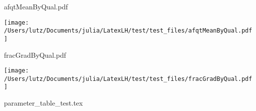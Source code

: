 \documentclass[english]{beamer}
\begin{document}
\begin{frame}{afqtMeanByQual.pdf}
\begin{center}
\texttt{[image: /Users/lutz/Documents/julia/LatexLH/test/test\_files/afqtMeanByQual.pdf]}
\end{center}
\end{frame}
\begin{frame}{fracGradByQual.pdf}
\begin{center}
\texttt{[image: /Users/lutz/Documents/julia/LatexLH/test/test\_files/fracGradByQual.pdf]}
\end{center}
\end{frame}
\begin{frame}{parameter\_table\_test.tex}
\begin{table}[h]
\centering
\begin{adjustbox}{width=1\textwidth}

\end{adjustbox}
\end{table}
\end{frame}
\end{document}
